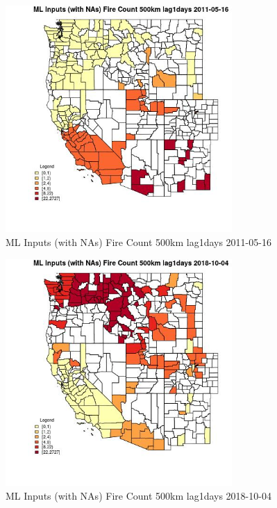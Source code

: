 \begin{figure} 
\centering  
\includegraphics[width=0.77\textwidth]{Code_Outputs/Report_ML_input_PM25_Step4_part_f_de_duplicated_aveswNAs_CountyFire_Count_500km_lag1daysMean2011-05-16.jpg} 
\caption{\label{fig:Report_ML_input_PM25_Step4_part_f_de_duplicated_aveswNAsCountyFire_Count_500km_lag1daysMean2011-05-16}ML Inputs (with NAs) Fire Count 500km lag1days 2011-05-16} 
\end{figure} 
 

\begin{figure} 
\centering  
\includegraphics[width=0.77\textwidth]{Code_Outputs/Report_ML_input_PM25_Step4_part_f_de_duplicated_aveswNAs_CountyFire_Count_500km_lag1daysMean2018-10-04.jpg} 
\caption{\label{fig:Report_ML_input_PM25_Step4_part_f_de_duplicated_aveswNAsCountyFire_Count_500km_lag1daysMean2018-10-04}ML Inputs (with NAs) Fire Count 500km lag1days 2018-10-04} 
\end{figure} 
 

